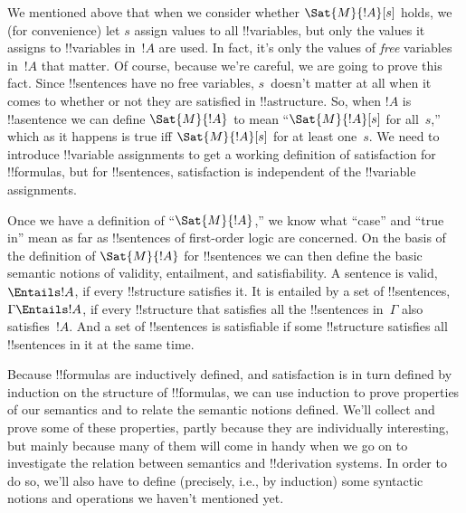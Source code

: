 \documentclass[../../../include/open-logic-section]{subfiles}
\begin{document}


We mentioned above that when we consider whether $\Sat{M}{!A}[s]$
holds, we (for convenience) let $s$ assign values to all !!{variable}s,
but only the values it assigns to !!{variable}s in~$!A$ are used.  In
fact, it's only the values of \emph{free} variables in~$!A$ that
matter. Of course, because we're careful, we are going to prove this
fact. Since !!{sentence}s have no free variables, $s$~doesn't matter
at all when it comes to whether or not they are satisfied in
!!a{structure}.  So, when $!A$ is !!a{sentence} we can define
$\Sat{M}{!A}$ to mean ``$\Sat{M}{!A}[s]$ for all~$s$,'' which as it
happens is true iff $\Sat{M}{!A}[s]$ for at least one~$s$. We need to
introduce !!{variable} assignments to get a working definition of
satisfaction for !!{formula}s, but for !!{sentence}s, satisfaction is
independent of the !!{variable} assignments.

Once we have a definition of ``$\Sat{M}{!A}$,'' we know what ``case''
and ``true in'' mean as far as !!{sentence}s of first-order logic are
concerned. On the basis of the definition of $\Sat{M}{!A}$ for
!!{sentence}s we can then define the basic semantic notions of
validity, entailment, and satisfiability.  A sentence is valid,
$\Entails !A$, if every !!{structure} satisfies it. It is entailed by
a set of !!{sentence}s, $\Gamma \Entails !A$, if every !!{structure}
that satisfies all the !!{sentence}s in~$\Gamma$ also satisfies~$!A$.
And a set of !!{sentence}s is satisfiable if some !!{structure}
satisfies all !!{sentence}s in it at the same time.

Because !!{formula}s are inductively defined, and satisfaction is in
turn defined by induction on the structure of !!{formula}s, we can use
induction to prove properties of our semantics and to relate the
semantic notions defined.  We'll collect and prove some of these
properties, partly because they are individually interesting, but
mainly because many of them will come in handy when we go on to
investigate the relation between semantics and !!{derivation} systems. In order
to do so, we'll also have to define (precisely, i.e., by induction)
some syntactic notions and operations we haven't mentioned yet.
\end{document}
